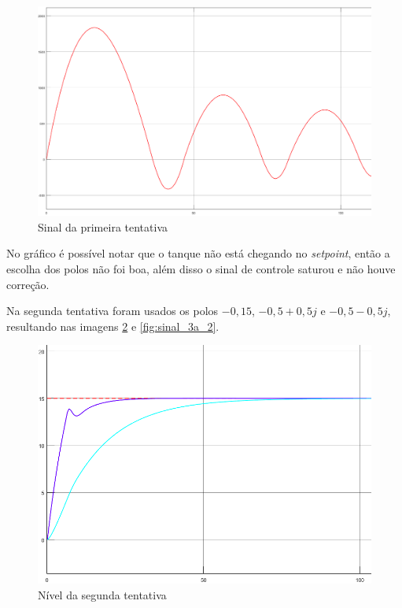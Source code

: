 \documentclass[
	12pt,				%
	openany,			%
	oneside,			%
	a4paper,			%
	english,			%
	french,				%
	spanish,			%
	brazil,				%
	]{abntex2}
\begin{document}
{\begin{figure}[h]
	\centering
	\includegraphics[scale=0.20]{imagens/sinal_3a_4.png}
	\caption{Sinal da primeira tentativa}
	\label{fig:sinal_3a_4}
\end{figure}

No gráfico é possível notar que o tanque não está chegando no \textit{setpoint}, então a escolha dos polos não foi boa, além disso o sinal de controle saturou e não houve correção.

Na segunda tentativa foram usados os polos $-0,15$, $-0,5+0,5j$ e $-0,5-0,5j$, resultando nas imagens \ref{fig:nivel_3a_2} e \ref{fig:sinal_3a_2}.

\begin{figure}[h]
	\centering
	\includegraphics[scale=0.30]{imagens/niveis_3a_2.png}
	\caption{Nível da segunda tentativa}
	\label{fig:nivel_3a_2}
\end{figure}

}
\end{document}
